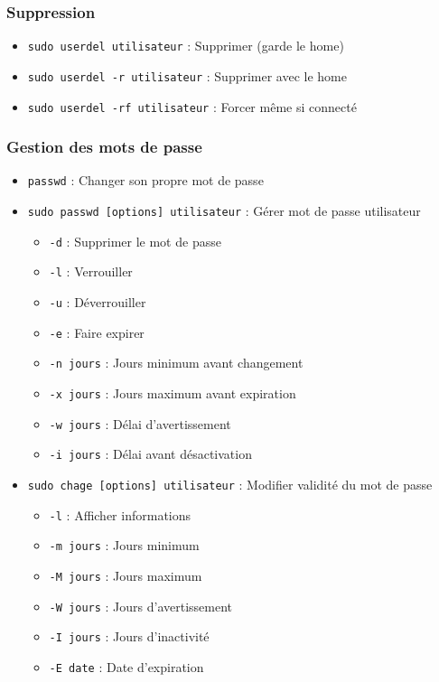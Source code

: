 \documentclass[12pt,a4paper]{article}
\begin{document}
\subsubsection{Suppression}
\begin{itemize}
    \item \texttt{sudo userdel utilisateur} : Supprimer (garde le home)
    \item \texttt{sudo userdel -r utilisateur} : Supprimer avec le home
    \item \texttt{sudo userdel -rf utilisateur} : Forcer même si connecté
\end{itemize}

\subsubsection{Gestion des mots de passe}
\begin{itemize}
    \item \texttt{passwd} : Changer son propre mot de passe
    \item \texttt{sudo passwd [options] utilisateur} : Gérer mot de passe utilisateur
    \begin{itemize}
        \item \texttt{-d} : Supprimer le mot de passe
        \item \texttt{-l} : Verrouiller
        \item \texttt{-u} : Déverrouiller
        \item \texttt{-e} : Faire expirer
        \item \texttt{-n jours} : Jours minimum avant changement
        \item \texttt{-x jours} : Jours maximum avant expiration
        \item \texttt{-w jours} : Délai d'avertissement
        \item \texttt{-i jours} : Délai avant désactivation
    \end{itemize}
    \item \texttt{sudo chage [options] utilisateur} : Modifier validité du mot de passe
    \begin{itemize}
        \item \texttt{-l} : Afficher informations
        \item \texttt{-m jours} : Jours minimum
        \item \texttt{-M jours} : Jours maximum
        \item \texttt{-W jours} : Jours d'avertissement
        \item \texttt{-I jours} : Jours d'inactivité
        \item \texttt{-E date} : Date d'expiration
    \end{itemize}
\end{itemize}
\end{document}
